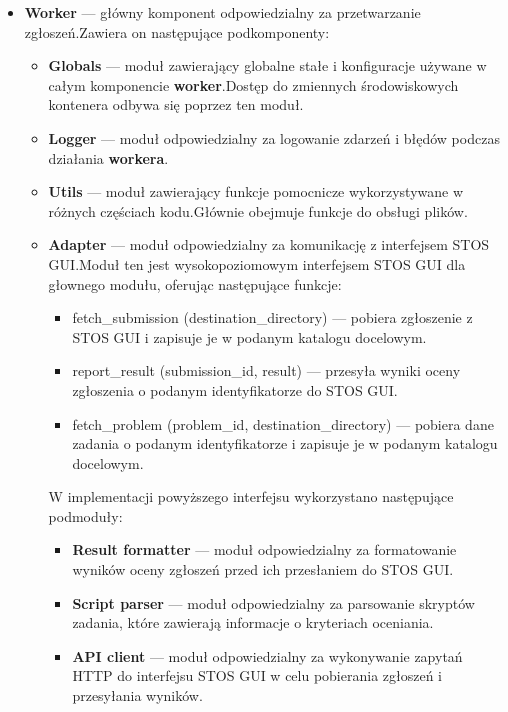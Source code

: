 \documentclass[12pt,a4paper]{article}
\begin{document}
\begin{itemize}
    \item \textbf{Worker} --- główny komponent odpowiedzialny za przetwarzanie zgłoszeń.\@ Zawiera on następujące podkomponenty:
    \begin{itemize}
        \item \textbf{Globals} --- moduł zawierający globalne stałe i konfiguracje używane w całym komponencie \textbf{worker}.\@ Dostęp do zmiennych środowiskowych kontenera odbywa się poprzez ten moduł.
        \item \textbf{Logger} --- moduł odpowiedzialny za logowanie zdarzeń i błędów podczas działania \textbf{workera}.
        \item \textbf{Utils} --- moduł zawierający funkcje pomocnicze wykorzystywane w różnych częściach kodu.\@ Głównie obejmuje funkcje do obsługi plików.
        \item \textbf{Adapter} --- moduł odpowiedzialny za komunikację z interfejsem STOS GUI.\@ Moduł ten jest wysokopoziomowym interfejsem STOS GUI dla głownego modułu, oferując następujące funkcje:
        \begin{itemize}
            \item fetch\_submission (destination\_directory) --- pobiera zgłoszenie z STOS GUI i zapisuje je w podanym katalogu docelowym.
            \item report\_result (submission\_id, result) --- przesyła wyniki oceny zgłoszenia o podanym identyfikatorze do STOS GUI.\
            \item fetch\_problem (problem\_id, destination\_directory) --- pobiera dane zadania o podanym identyfikatorze i zapisuje je w podanym katalogu docelowym.\
        \end{itemize}
        W implementacji powyższego interfejsu wykorzystano następujące podmoduły:
              \begin{itemize}
                  \item \textbf{Result formatter} --- moduł odpowiedzialny za formatowanie wyników oceny zgłoszeń przed ich przesłaniem do STOS GUI.\@
                  \item \textbf{Script parser} --- moduł odpowiedzialny za parsowanie skryptów zadania, które zawierają informacje o kryteriach oceniania.
                  \item \textbf{API client} --- moduł odpowiedzialny za wykonywanie zapytań HTTP do interfejsu STOS GUI w celu pobierania zgłoszeń i przesyłania wyników.
              \end{itemize}
    \end{itemize}
\end{itemize}
\end{document}
